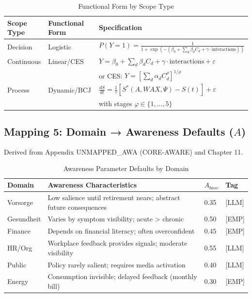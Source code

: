 \begin{table}[htbp]
\centering
\caption{Functional Form by Scope Type}
\label{tab:ggg-form-mapping}
\renewcommand{\arraystretch}{1.4}
\begin{tabular}{@{}llp{5cm}@{}}
\toprule
\textbf{Scope Type} & \textbf{Functional Form} & \textbf{Specification} \\
\midrule
Decision & Logistic & $P(Y=1) = \frac{1}{1+\exp(-(\beta_0 + \sum_d \beta_d C_d + \gamma \cdot \text{interactions}))}$ \\
\addlinespace
Continuous & Linear/CES & $Y = \beta_0 + \sum_d \beta_d C_d + \gamma \cdot \text{interactions} + \varepsilon$ \\
& & or CES: $Y = [\sum_d \alpha_d C_d^\rho]^{1/\rho}$ \\
\addlinespace
Process & Dynamic/BCJ & $\frac{dS}{dt} = \frac{1}{\tau}[S^*(A, WAX, \Psi) - S(t)] + \varepsilon$ \\
& & with stages $\varphi \in \{1,...,5\}$ \\
\bottomrule
\end{tabular}
\end{table}


\subsection{Mapping 5: Domain → Awareness Defaults ($A$)}

Derived from Appendix UNMAPPED_AWA (CORE-AWARE) and Chapter 11.

\begin{table}[htbp]
\centering
\caption{Awareness Parameter Defaults by Domain}
\label{tab:ggg-awareness-mapping}
\renewcommand{\arraystretch}{1.3}
\begin{tabular}{@{}lp{4cm}ll@{}}
\toprule
\textbf{Domain} & \textbf{Awareness Characteristics} & \textbf{$A_{base}$} & \textbf{Tag} \\
\midrule
Vorsorge & Low salience until retirement nears; abstract future consequences & 0.35 & [LLM] \\
Gesundheit & Varies by symptom visibility; acute > chronic & 0.50 & [EMP] \\
Finance & Depends on financial literacy; often overconfident & 0.45 & [EMP] \\
HR/Org & Workplace feedback provides signals; moderate visibility & 0.55 & [LLM] \\
Public & Policy rarely salient; requires media activation & 0.40 & [LLM] \\
Energy & Consumption invisible; delayed feedback (monthly bill) & 0.30 & [EMP] \\
\bottomrule
\end{tabular}
\end{table}

